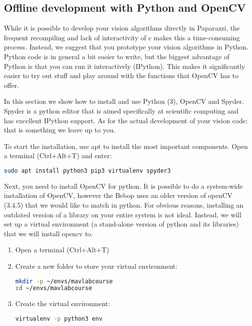 \documentclass{article}
\begin{document}
\subsection{Offline development with Python and OpenCV}
While it is possible to develop your vision algorithms directly in Paparazzi, the frequent recompiling and lack of interactivity of c makes this a time-consuming process.
Instead, we suggest that you prototype your vision algorithms in Python. Python code is in general a bit easier to write, but the biggest advantage of Python is that you can run it interactively (IPython). This makes it significantly easier to try out stuff and play around with the functions that OpenCV has to offer.

In this section we show how to install and use Python (3), OpenCV and Spyder. Spyder is a python editor that is aimed specifically at scientific computing and has excellent IPython support. As for the actual development of your vision code: that is something we leave up to you.

To start the installation, use apt to install the most important components. Open a terminal (Ctrl+Alt+T) and enter:
\begin{lstlisting}[language=bash]
sudo apt install python3 pip3 virtualenv spyder3
\end{lstlisting}

Next, you need to install OpenCV for python. It is possible to do a system-wide installation of OpenCV, however the Bebop uses an older version of openCV (3.4.5) that we would like to match in python. For obvious reasons, installing an outdated version of a library on your entire system is not ideal. Instead, we will set up a virtual environment (a stand-alone version of python and its libraries) that we will install opencv to.
\begin{enumerate}
\item Open a terminal (Ctrl+Alt+T)
\item Create a new folder to store your virtual environment:
\begin{lstlisting}[language=bash]
mkdir -p ~/envs/mavlabcourse
cd ~/envs/mavlabcourse
\end{lstlisting}
\item Create the virtual environment:
\begin{lstlisting}[language=bash]
virtualenv -p python3 env
\end{lstlisting}
\end{enumerate}
\end{document}
